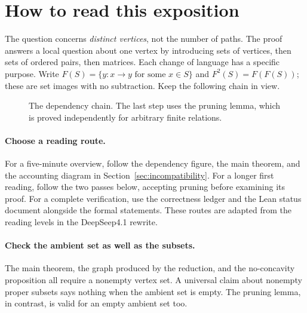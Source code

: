 \section*{How to read this exposition}
The question concerns \emph{distinct vertices}, not the number of paths.
The proof answers a local question about one vertex by introducing sets of
vertices, then sets of ordered pairs, then matrices. Each change of language
has a specific purpose. Write $F(S)=\{y:x\to y\text{ for some }x\in S\}$
and $F^2(S)=F(F(S))$; these are set images with no subtraction.
Keep the following chain in view.
\begin{figure}[ht]
\centering
{}
\caption{The dependency chain. The last step uses the pruning lemma, which is proved independently for arbitrary finite relations.}
\end{figure}

\paragraph{Choose a reading route.}
For a five-minute overview, follow the dependency figure, the main theorem,
and the accounting diagram in Section~\ref{sec:incompatibility}.
For a longer first reading, follow the two passes below, accepting pruning
before examining its proof. For a complete verification, use the correctness
ledger and the Lean status document alongside the formal statements. These
routes are adapted from the reading levels in the DeepSeep4.1 rewrite.

\paragraph{Check the ambient set as well as the subsets.}
The main theorem, the graph produced by the reduction, and the no-concavity
proposition all require a nonempty vertex set. A universal claim about
nonempty proper subsets says nothing when the ambient set is empty. The
pruning lemma, in contrast, is valid for an empty ambient set too.

